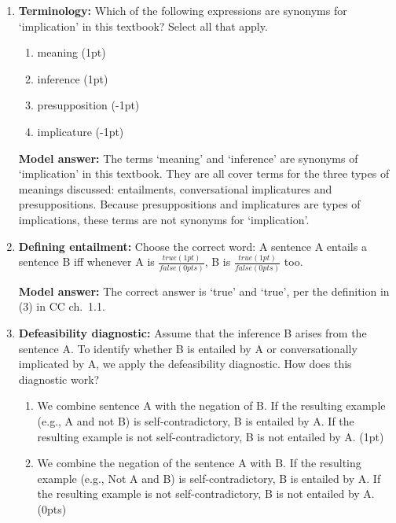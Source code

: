 \documentclass[a4,11pt]{article}
\begin{document}
\begin{enumerate}[leftmargin = 12pt]
    \item {\bf Terminology:} Which of the following expressions are synonyms for `implication' in this textbook? Select all that apply.
 
   \begin{enumerate}[noitemsep]
       \item meaning (1pt)
        \item inference (1pt)
           \item presupposition (-1pt)
           \item implicature (-1pt)
   \end{enumerate}
   
   {\bf Model answer:} The terms `meaning' and `inference' are synonyms of `implication' in this textbook. They are all cover terms for the three types of meanings discussed: entailments, conversational implicatures and presuppositions. Because presuppositions and implicatures are types of implications, these terms are not synonyms for `implication'.
      
 \item {\bf Defining entailment:} Choose the correct word: A sentence A entails a sentence B iff whenever A is $\frac{true (1pt)}{false (0pts)}$, B is $\frac{true (1pt)}{false (0pts)}$ too. 
 
  {\bf Model answer:} The correct answer is `true' and `true', per the definition in (3) in CC ch.\ 1.1.

\item {\bf Defeasibility diagnostic:} Assume that the inference B arises from the sentence A. To identify whether B is entailed by A or conversationally implicated by A, we apply the defeasibility diagnostic. How does this diagnostic work?

 \begin{enumerate}[noitemsep]

       \item We combine sentence A with the negation of B. If the resulting example (e.g., A and not B) is self-contradictory, B is entailed by A. If the resulting example is not self-contradictory, B is not entailed by A. (1pt)

       \item We combine the negation of the sentence A with B. If the resulting example (e.g., Not A and B) is self-contradictory, B is entailed by A. If the resulting example is not self-contradictory, B is not entailed by A. (0pts)
       
   \end{enumerate}


\end{enumerate}
\end{document}
